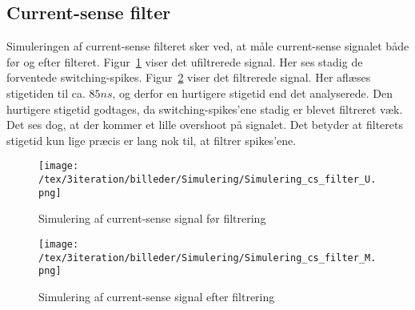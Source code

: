 
\subsection{Current-sense filter}
Simuleringen af current-sense filteret sker ved, at måle current-sense signalet både før og efter filteret. Figur~\ref{fig:Simulering_PWM_current_sense_U_3} viser det ufiltrerede signal. Her ses stadig de forventede switching-spikes. Figur~\ref{fig:Simulering_PWM_current_sense_M_3} viser det filtrerede signal. Her aflæses stigetiden til ca. $85ns$, og derfor en hurtigere stigetid end det analyserede. Den hurtigere stigetid godtages, da switching-spikes'ene stadig er blevet filtreret væk. Det ses dog, at der kommer et lille overshoot på signalet. Det betyder at filterets stigetid kun lige præcis er lang nok til, at filtrer spikes'ene. 

\begin{figure}[H]
	\center
	\texttt{[image: /tex/3iteration/billeder/Simulering/Simulering\_cs\_filter\_U.png]}
	\caption{Simulering af current-sense signal før filtrering}
	\label{fig:Simulering_PWM_current_sense_U_3}
\end{figure}

\begin{figure}[H]
	\center
	\texttt{[image: /tex/3iteration/billeder/Simulering/Simulering\_cs\_filter\_M.png]}
	\caption{Simulering af current-sense signal efter filtrering}
	\label{fig:Simulering_PWM_current_sense_M_3}
\end{figure}
